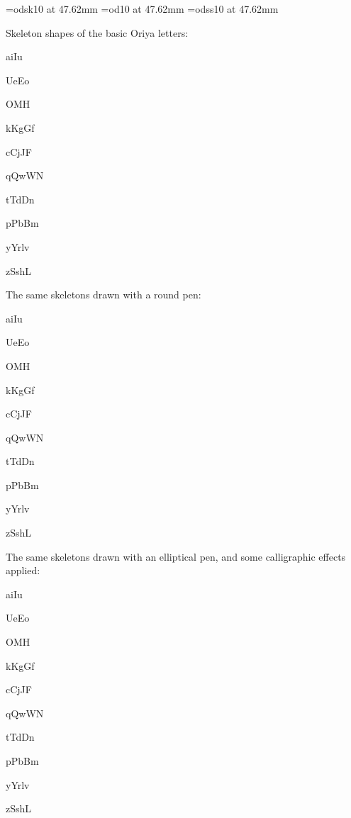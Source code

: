 


\overfullrule=0pt
\font\odsk=odsk10 at 47.62mm
\font\od=od10 at 47.62mm
\font\odss=odss10 at 47.62mm

Skeleton shapes of the basic Oriya letters:
{\baselineskip=40mm\odsk 

aiIu

UeEo

OMH 

kKgGf

cCjJF

qQwWN

tTdDn

pPbBm

yYrlv

zSshL

\odkSa\odjnya

}

\vfill\eject
The same skeletons drawn with a round pen:
{\baselineskip=40mm\odss 

aiIu

UeEo

OMH 

kKgGf

cCjJF

qQwWN

tTdDn

pPbBm

yYrlv

zSshL

\odkSa\odjnya

}

\vfill\eject
The same skeletons drawn with an elliptical pen, and some calligraphic
effects applied:
{\baselineskip=40mm\od

aiIu

UeEo

OMH 

kKgGf

cCjJF

qQwWN

tTdDn

pPbBm

yYrlv

zSshL

\odkSa\odjnya

}

\bye
